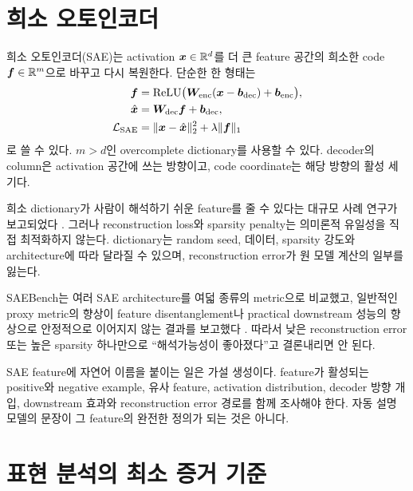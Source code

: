 \section{희소 오토인코더}

희소 오토인코더(SAE)는 activation $\bm{x}\in\mathbb{R}^d$를 더 큰 feature 공간의 희소한 code $\bm{f}\in\mathbb{R}^m$으로 바꾸고 다시 복원한다.
단순한 한 형태는
\begin{align}
  \bm{f}&=\operatorname{ReLU}
  \bigl(\bm{W}_{\mathrm{enc}}(\bm{x}-\bm{b}_{\mathrm{dec}})
  +\bm{b}_{\mathrm{enc}}\bigr),\\
  \hat{\bm{x}}&=\bm{W}_{\mathrm{dec}}\bm{f}+\bm{b}_{\mathrm{dec}},\\
  \mathcal{L}_{\mathrm{SAE}}&=\lVert\bm{x}-\hat{\bm{x}}\rVert_2^2
  +\lambda\lVert\bm{f}\rVert_1
  \label{eq:sae}
\end{align}
로 쓸 수 있다.
$m>d$인 overcomplete dictionary를 사용할 수 있다.
decoder의 column은 activation 공간에 쓰는 방향이고, code coordinate는 해당 방향의 활성 세기다.

희소 dictionary가 사람이 해석하기 쉬운 feature를 줄 수 있다는 대규모 사례 연구가 보고되었다 \citep{bricken2023monosemantic,templeton2024scaling}.
그러나 reconstruction loss와 sparsity penalty는 의미론적 유일성을 직접 최적화하지 않는다.
dictionary는 random seed, 데이터, sparsity 강도와 architecture에 따라 달라질 수 있으며, reconstruction error가 원 모델 계산의 일부를 잃는다.

SAEBench는 여러 SAE architecture를 여덟 종류의 metric으로 비교했고, 일반적인 proxy metric의 향상이 feature disentanglement나 practical downstream 성능의 향상으로 안정적으로 이어지지 않는 결과를 보고했다 \citep{karvonen2025saebench}.
따라서 낮은 reconstruction error 또는 높은 sparsity 하나만으로 ``해석가능성이 좋아졌다''고 결론내리면 안 된다.

\begin{limitbox}
SAE feature에 자연어 이름을 붙이는 일은 가설 생성이다.
feature가 활성되는 positive와 negative example, 유사 feature, activation distribution, decoder 방향 개입, downstream 효과와 reconstruction error 경로를 함께 조사해야 한다.
자동 설명 모델의 문장이 그 feature의 완전한 정의가 되는 것은 아니다.
\end{limitbox}

\section{표현 분석의 최소 증거 기준}

